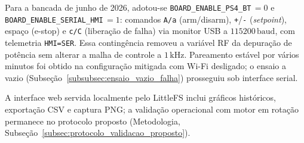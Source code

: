 \begin{table}[H]
    \centering
    \caption{Regressões de enlace Bluetooth Classic (PS4 / Bluepad32) em ensaios de potência, Wi-Fi desligado.}
    \label{tab:regressoes_bluetooth_ps4}
\end{table}

Para a bancada de junho de 2026, adotou-se \texttt{BOARD\_ENABLE\_PS4\_BT}\,$= 0$ e \texttt{BOARD\_ENABLE\_SERIAL\_HMI}\,$= 1$: comandos \texttt{A/a} (arm/disarm), \texttt{+}/\texttt{-} (\textit{setpoint}), espaço (e-stop) e \texttt{c/C} (liberação de falha) via monitor USB a $115200\,\text{baud}$, com telemetria \texttt{HMI=SER}. Essa contingência removeu a variável RF da depuração de potência sem alterar a malha de controle a $1\,\text{kHz}$. Pareamento estável por vários minutos foi obtido na configuração mitigada com Wi-Fi desligado; o ensaio a vazio (Subseção~\ref{subsubsec:ensaio_vazio_falha}) prosseguiu sob interface serial.

A interface web servida localmente pelo LittleFS inclui gráficos históricos, exportação CSV e captura PNG; a validação operacional com motor em rotação permanece no protocolo proposto (Metodologia, Subseção~\ref{subsec:protocolo_validacao_proposto}).

